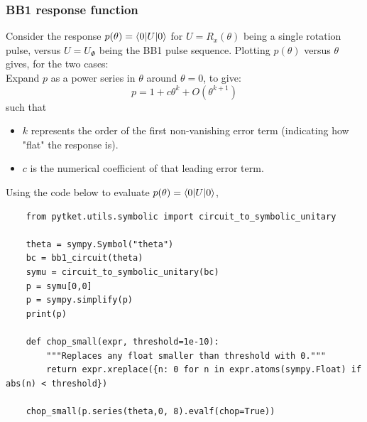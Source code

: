 \subsubsection{BB1 response function}
Consider the response $p(\theta) = \braket{0|U|0}$ for $U = R_x(\theta)$ being a single rotation pulse, versus $U = U_\Phi$  being the BB1 pulse sequence. Plotting $p(\theta)$ versus $\theta$ gives, for the two cases:\\

Expand $p$ as a power series in $\theta$ around $\theta=0$, to give:
\begin{equation}
    p = 1 + c \theta^k + O(\theta^{k+1})
\end{equation}
such that 
\begin{itemize}
    \item $k$ represents the order of the first non-vanishing error term (indicating how "flat" the response is).
    \item $c$ is the numerical coefficient of that leading error term.
\end{itemize}


Using the code below to evaluate $p(\theta) = \braket{0|U|0}$,
\begin{lstlisting}
    from pytket.utils.symbolic import circuit_to_symbolic_unitary

    theta = sympy.Symbol("theta")
    bc = bb1_circuit(theta)
    symu = circuit_to_symbolic_unitary(bc)
    p = symu[0,0]
    p = sympy.simplify(p)
    print(p)
    
    def chop_small(expr, threshold=1e-10):
        """Replaces any float smaller than threshold with 0."""
        return expr.xreplace({n: 0 for n in expr.atoms(sympy.Float) if abs(n) < threshold})
    
    chop_small(p.series(theta,0, 8).evalf(chop=True))
\end{lstlisting}

\noindent{}
\newpage
